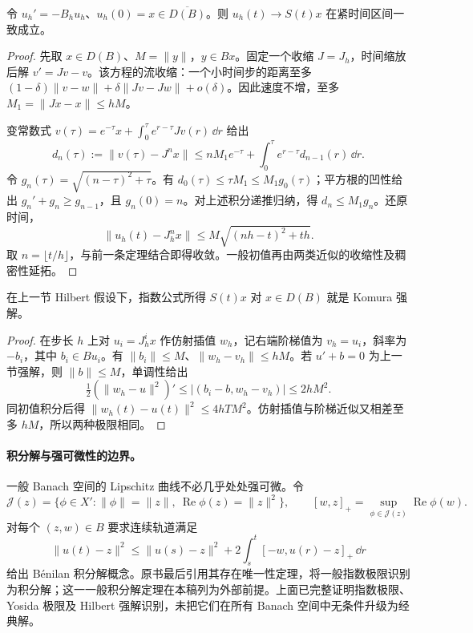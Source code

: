 \begin{theorem}\label{thm:y14-yosida-exponential}
令 $u_h'=-B_hu_h$、$u_h(0)=x\in\overline{D(B)}$。则 $u_h(t)\to S(t)x$ 在紧时间区间一致成立。
\end{theorem}
\begin{proof}
先取 $x\in D(B)$、$M=\|y\|$，$y\in Bx$。固定一个收缩 $J=J_h$，时间缩放后解 $v'=Jv-v$。该方程的流收缩：一个小时间步的距离至多 $(1-\delta)\|v-w\|+\delta\|Jv-Jw\|+o(\delta)$。因此速度不增，至多 $M_1=\|Jx-x\|\le hM$。

变常数式 $v(\tau)=e^{-\tau}x+\int_0^\tau e^{r-\tau}Jv(r)\,\dd r$ 给出
\[
 d_n(\tau):=\|v(\tau)-J^nx\|
 \le nM_1e^{-\tau}+\int_0^\tau e^{r-\tau}d_{n-1}(r)\,\dd r.
\]
令 $g_n(\tau)=\sqrt{(n-\tau)^2+\tau}$。有 $d_0(\tau)\le\tau M_1\le M_1g_0(\tau)$；平方根的凹性给出 $g_n'+g_n\ge g_{n-1}$，且 $g_n(0)=n$。对上述积分递推归纳，得 $d_n\le M_1g_n$。还原时间，
\[
 \|u_h(t)-J_h^nx\|\le M\sqrt{(nh-t)^2+th}.
\]
取 $n=\lfloor t/h\rfloor$，与前一条定理结合即得收敛。一般初值再由两类近似的收缩性及稠密性延拓。
\end{proof}

\begin{proposition}\label{prop:y14-euler-strong}
在上一节 Hilbert 假设下，指数公式所得 $S(t)x$ 对 $x\in D(B)$ 就是 Komura 强解。
\end{proposition}
\begin{proof}
在步长 $h$ 上对 $u_i=J_h^ix$ 作仿射插值 $w_h$，记右端阶梯值为 $v_h=u_i$，斜率为 $-b_i$，其中 $b_i\in Bu_i$。有 $\|b_i\|\le M$、$\|w_h-v_h\|\le hM$。若 $u'+b=0$ 为上一节强解，则 $\|b\|\le M$，单调性给出
\[
 \tfrac12(\|w_h-u\|^2)'
 \le| (b_i-b,w_h-v_h)|\le2hM^2.
\]
同初值积分后得 $\|w_h(t)-u(t)\|^2\le4hTM^2$。仿射插值与阶梯近似又相差至多 $hM$，所以两种极限相同。
\end{proof}

\paragraph{积分解与强可微性的边界。}
一般 Banach 空间的 Lipschitz 曲线不必几乎处处强可微。令
\[
 \mathcal J(z)=\{\phi\in X':\|\phi\|=\|z\|,\ \operatorname{Re}\phi(z)=\|z\|^2\},\qquad
 [w,z]_+=\sup_{\phi\in\mathcal J(z)}\operatorname{Re}\phi(w).
\]
对每个 $(z,w)\in B$ 要求连续轨道满足
\[
 \|u(t)-z\|^2\le\|u(s)-z\|^2
 +2\int_s^t[-w,u(r)-z]_+\,\dd r
\]
给出 B\'enilan 积分解概念。原书最后引用其存在唯一性定理，将一般指数极限识别为积分解；这一一般积分解定理在本稿列为外部前提。上面已完整证明指数极限、Yosida 极限及 Hilbert 强解识别，未把它们在所有 Banach 空间中无条件升级为经典解。

